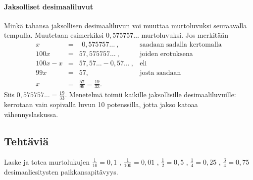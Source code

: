 

\paragraph*{Jaksolliset desimaaliluvut}

Minkä tahansa jaksollisen desimaaliluvun voi muuttaa murtoluvuksi seuraavalla tempulla.
Muutetaan esimerkiksi $0,575757\ldots$ murtoluvuksi. Jos merkitään
\[
\begin{array}{rcll}
x &=& \ \, 0,575757 \ldots\ , &\textrm{saadaan sadalla kertomalla} \\
100x &=& 57,575757 \ldots \ , &\textrm{joiden erotuksena} \\
100x - x &=& 57,57 \ldots - 0,57 \ldots \ , & \textrm{eli} \\
99x &=& 57, & \textrm{josta saadaan} \\
x &=& \frac{57}{99} = \frac{19}{33}.
\end{array}
\]
Siis $0,575757\ldots = \frac{19}{33}$. Menetelmä toimii kaikille jaksollisille
desimaaliluvuille: kerrotaan vain sopivalla luvun 10 potenssilla, jotta jakso
katoaa vähennyslaskussa.


\subsection*{Tehtäviä}

\begin{tehtava}
Laske ja totea murtolukujen 
 $ \frac{1}{10} = 0,1$ , 
$ \frac{1}{100} = 0,01$ , 
 $ \frac{1}{2} = 0,5$ , 
$ \frac{1}{4} = 0,25$ , 
$ \frac{3}{4} = 0,75$
desimaaliesitysten paikkansapitävyys.
\end{tehtava}

